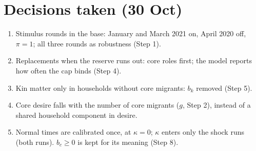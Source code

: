 \documentclass[11pt]{article}
\begin{document}
\section*{Decisions taken (30 Oct)}

\begin{enumerate}[leftmargin=*]
\item Stimulus rounds in the base: January and March 2021 on, April 2020 off, $\pi = 1$; all three rounds as robustness (Step 1).
\item Replacements when the reserve runs out: core roles first; the model reports how often the cap binds (Step 4).
\item Kin matter only in households without core migrants: $b_k$ removed (Step 5).
\item Core desire falls with the number of core migrants ($g$, Step 2), instead of a shared household component in desire.
\item Normal times are calibrated once, at $\kappa = 0$; $\kappa$ enters only the shock runs (both runs). $b_c \ge 0$ is kept for its meaning (Step 8).
\end{enumerate}
\end{document}
